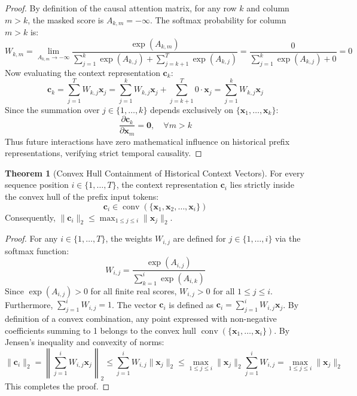 \documentclass[11pt,a4paper]{article}
\theoremstyle{definition}
\newtheorem{theorem}{\textbf{Theorem}}[section]
\begin{document}
\begin{proof}
By definition of the causal attention matrix, for any row $k$ and column $m > k$, the masked score is $A_{k, m} = -\infty$.
The softmax probability for column $m > k$ is:
{\boldmath
\begin{equation}
W_{k, m} = \lim_{A_{k, m} \to -\infty} \frac{\exp(A_{k, m})}{\sum_{j=1}^k \exp(A_{k, j}) + \sum_{j=k+1}^T \exp(A_{k, j})} = \frac{0}{\sum_{j=1}^k \exp(A_{k, j}) + 0} = 0
\end{equation}
}
Now evaluating the context representation $\mathbf{c}_k$:
{\boldmath
\begin{equation}
\mathbf{c}_k = \sum_{j=1}^T W_{k, j} \mathbf{x}_j = \sum_{j=1}^k W_{k, j} \mathbf{x}_j + \sum_{j=k+1}^T 0 \cdot \mathbf{x}_j = \sum_{j=1}^k W_{k, j} \mathbf{x}_j
\end{equation}
}
Since the summation over $j \in \{1, \dots, k\}$ depends exclusively on $\{\mathbf{x}_1, \dots, \mathbf{x}_k\}$:
{\boldmath
\begin{equation}
\frac{\partial \mathbf{c}_k}{\partial \mathbf{x}_m} = \mathbf{0}, \quad \forall m > k
\end{equation}
}
Thus future interactions have zero mathematical influence on historical prefix representations, verifying strict temporal causality.
\end{proof}

\begin{theorem}[Convex Hull Containment of Historical Context Vectors]
For every sequence position $i \in \{1, \dots, T\}$, the context representation $\mathbf{c}_i$ lies strictly inside the convex hull of the prefix input tokens:
{\boldmath
\begin{equation}
\mathbf{c}_i \in \operatorname{conv}(\{\mathbf{x}_1, \mathbf{x}_2, \dots, \mathbf{x}_i\})
\end{equation}
}
Consequently, $\|\mathbf{c}_i\|_2 \le \max_{1 \le j \le i} \|\mathbf{x}_j\|_2$.
\end{theorem}

\begin{proof}
For any $i \in \{1, \dots, T\}$, the weights $W_{i, j}$ are defined for $j \in \{1, \dots, i\}$ via the softmax function:
{\boldmath
\begin{equation}
W_{i, j} = \frac{\exp(A_{i, j})}{\sum_{k=1}^i \exp(A_{i, k})}
\end{equation}
}
Since $\exp(A_{i, j}) > 0$ for all finite real scores, $W_{i, j} > 0$ for all $1 \le j \le i$.
Furthermore, $\sum_{j=1}^i W_{i, j} = 1$.
The vector $\mathbf{c}_i$ is defined as $\mathbf{c}_i = \sum_{j=1}^i W_{i, j} \mathbf{x}_j$.
By definition of a convex combination, any point expressed with non-negative coefficients summing to 1 belongs to the convex hull $\operatorname{conv}(\{\mathbf{x}_1, \dots, \mathbf{x}_i\})$.
By Jensen's inequality and convexity of norms:
{\boldmath
\begin{equation}
\|\mathbf{c}_i\|_2 = \left\| \sum_{j=1}^i W_{i, j} \mathbf{x}_j \right\|_2 \le \sum_{j=1}^i W_{i, j} \|\mathbf{x}_j\|_2 \le \max_{1 \le j \le i} \|\mathbf{x}_j\|_2 \sum_{j=1}^i W_{i, j} = \max_{1 \le j \le i} \|\mathbf{x}_j\|_2
\end{equation}
}
This completes the proof.
\end{proof}
\end{document}
